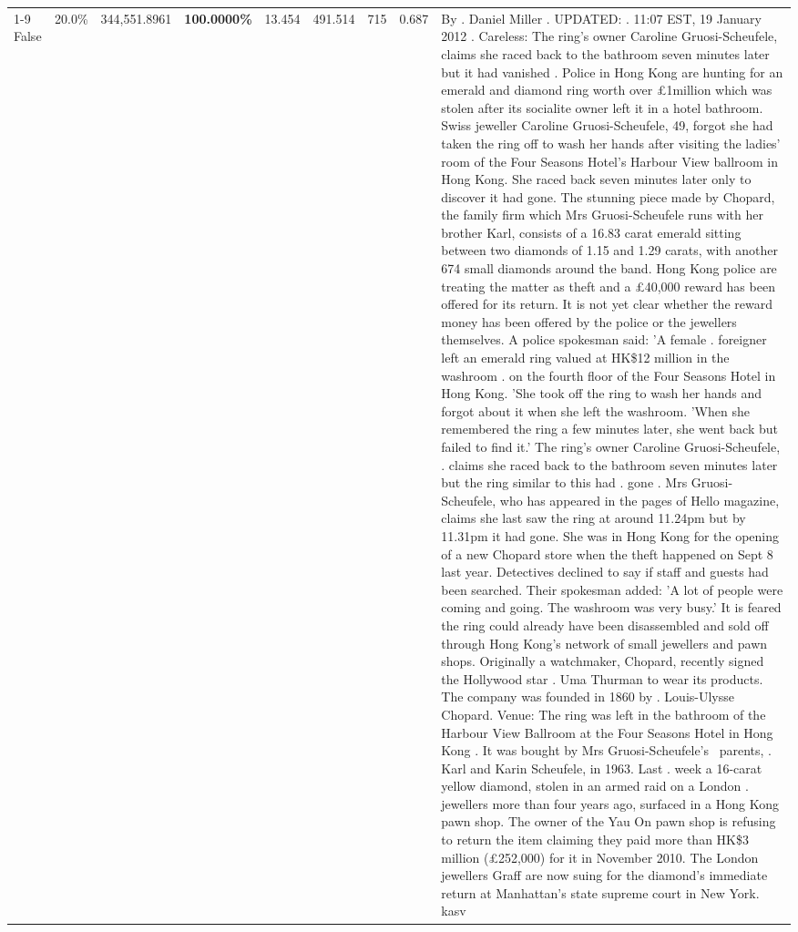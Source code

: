 \begin{table}[H]
\begin{tabular}{lllrlllll}
\cline{1-9}
False & 20.0\% & 344,551.8961 & \bfseries \color{red} 100.0000\% & 13.454 & 491.514 & 715 & 0.687 & By . Daniel Miller . UPDATED: . 11:07 EST, 19 January 2012 . Careless: The ring's owner Caroline Gruosi-Scheufele, claims she raced back to the bathroom seven minutes later but it had vanished . Police in Hong Kong are hunting for an emerald and diamond ring worth over £1million which was stolen after its socialite owner left it in a hotel bathroom. Swiss jeweller Caroline Gruosi-Scheufele, 49, forgot she had taken the ring off to wash her hands after visiting the ladies' room of the Four Seasons Hotel's Harbour View ballroom in Hong Kong. She raced back seven minutes later only to discover it had gone. The stunning piece made by Chopard, the family firm which Mrs Gruosi-Scheufele runs with her brother Karl, consists of a 16.83 carat emerald sitting between two diamonds of 1.15 and 1.29 carats, with another 674 small diamonds around the band. Hong Kong police are treating the matter as theft and a £40,000 reward has been offered for its return. It is not yet clear whether the reward money has been offered by the police or the jewellers themselves. A police spokesman said: 'A female . foreigner left an emerald ring valued at HK\$12 million in the washroom . on the fourth floor of the Four Seasons Hotel in Hong Kong. 'She took off the ring to wash her hands and forgot about it when she left the washroom. 'When she remembered the ring a few minutes later, she went back but failed to find it.' The ring's owner Caroline Gruosi-Scheufele, . claims she raced back to the bathroom seven minutes later but the ring similar to this had . gone . Mrs Gruosi-Scheufele, who has appeared in the pages of Hello magazine, claims she last saw the ring at around 11.24pm but by 11.31pm it had gone. She was in Hong Kong for the opening of a new Chopard store when the theft happened on Sept 8 last year. Detectives declined to say if staff and guests had been searched. Their spokesman added: 'A lot of people were coming and going. The washroom was very busy.' It is feared the ring could already have been disassembled and sold off through Hong Kong's network of small jewellers and pawn shops. Originally a watchmaker, Chopard, recently signed the Hollywood star . Uma Thurman to wear its products. The company was founded in 1860 by . Louis-Ulysse Chopard. Venue: The ring was left in the bathroom of the Harbour View Ballroom at the Four Seasons Hotel in Hong Kong . It was bought by Mrs Gruosi-Scheufele's  parents, . Karl and Karin Scheufele, in 1963. Last . week a 16-carat yellow diamond, stolen in an armed raid on a London . jewellers more than four years ago, surfaced in a Hong Kong pawn shop. The owner of the Yau On pawn shop is refusing to return the item claiming they paid more than HK\$3 million (£252,000) for it in November 2010. The London jewellers Graff are now suing for the diamond’s immediate return at Manhattan’s state supreme court in New York. kasv \\

\end{tabular}
\end{table}
